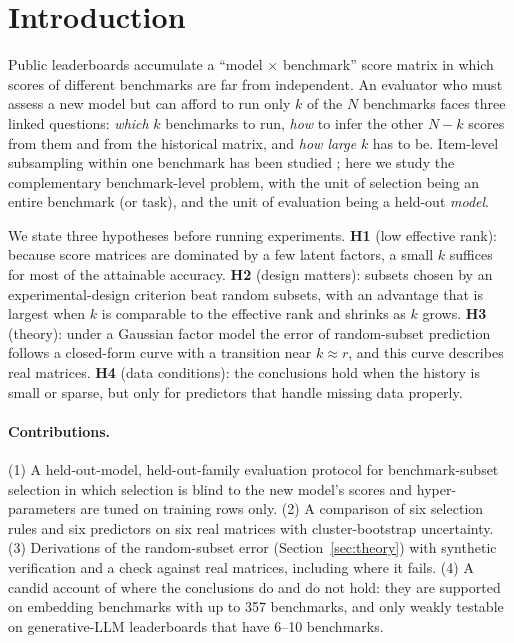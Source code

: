 \documentclass{article}
\begin{document}
\section{Introduction}
Public leaderboards accumulate a ``model $\times$ benchmark'' score matrix in which scores of different benchmarks are far from independent. An evaluator who must assess a new model but can afford to run only $k$ of the $N$ benchmarks faces three linked questions: \emph{which} $k$ benchmarks to run, \emph{how} to infer the other $N-k$ scores from them and from the historical matrix, and \emph{how large} $k$ has to be. Item-level subsampling within one benchmark has been studied \citep{polo2024tiny,vivek2024anchor,kipnis2024metabench}; here we study the complementary benchmark-level problem, with the unit of selection being an entire benchmark (or task), and the unit of evaluation being a held-out \emph{model}.

We state three hypotheses before running experiments. \textbf{H1} (low effective rank): because score matrices are dominated by a few latent factors, a small $k$ suffices for most of the attainable accuracy. \textbf{H2} (design matters): subsets chosen by an experimental-design criterion beat random subsets, with an advantage that is largest when $k$ is comparable to the effective rank and shrinks as $k$ grows. \textbf{H3} (theory): under a Gaussian factor model the error of random-subset prediction follows a closed-form curve with a transition near $k\approx r$, and this curve describes real matrices. \textbf{H4} (data conditions): the conclusions hold when the history is small or sparse, but only for predictors that handle missing data properly.

\paragraph{Contributions.} (1) A held-out-model, held-out-family evaluation protocol for benchmark-subset selection in which selection is blind to the new model's scores and hyper-parameters are tuned on training rows only. (2) A comparison of six selection rules and six predictors on six real matrices with cluster-bootstrap uncertainty. (3) Derivations of the random-subset error (Section~\ref{sec:theory}) with synthetic verification and a check against real matrices, including where it fails. (4) A candid account of where the conclusions do and do not hold: they are supported on embedding benchmarks with up to 357 benchmarks, and only weakly testable on generative-LLM leaderboards that have 6--10 benchmarks.
\end{document}
